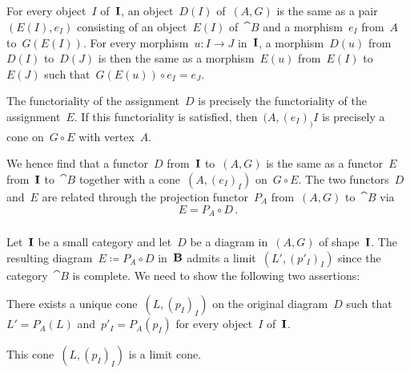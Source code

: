 \subsection{}



\subsubsection{}

For every object~$I$ of~$\mathbf{I}$, an object~$D(I)$ of~$(A \comma G)$ is the same as a pair~$(E(I), e_I)$ consisting of an object~$E(I)$ of~$\cat{B}$ and a morphism~$e_I$ from~$A$ to~$G(E(I))$.
For every morphism~$u \colon I \to J$ in~$\mathbf{I}$, a morphism~$D(u)$ from~$D(I)$ to~$D(J)$ is then the same as a morphism~$E(u)$ from~$E(I)$ to~$E(J)$ such that~$G(E(u)) ∘ e_I = e_J$.

The functoriality of the assignment~$D$ is precisely the functoriality of the assignment~$E$.
If this functoriality is satisfied, then~$(A, (e_I)_)I$ is precisely a cone on~$G ∘ E$ with vertex~$A$.

We hence find that a functor~$D$ from~$\mathbf{I}$ to~$(A \comma G)$ is the same as a functor~$E$ from~$\mathbf{I}$ to~$\cat{B}$ together with a cone~$(A, (e_I)_I)$ on~$G ∘ E$.
The two functors~$D$ and~$E$ are related through the projection functor~$P_A$ from~$(A \comma G)$ to~$\cat{B}$ via
\[
	E = P_A ∘ D \,.
\]



\subsubsection{}

Let~$\mathbf{I}$ be a small category and let~$D$ be a diagram in~$(A \comma G)$ of shape~$\mathbf{I}$.
The resulting diagram~$E ≔ P_A ∘ D$ in~$\mathbf{B}$ admits a limit~$(L', (p'_I)_I)$ since the category~$\cat{B}$ is complete.
We need to show the following two assertions:
\begin{enumerate*}

	\item
		There exists a unique cone~$(L, (p_I)_I)$ on the original diagram~$D$ such that~$L' = P_A(L)$ and~$p'_I = P_A(p_I)$ for every object~$I$ of~$\mathbf{I}$.

	\item
		This cone~$(L, (p_I)_I)$ is a limit cone.

\end{enumerate*}

